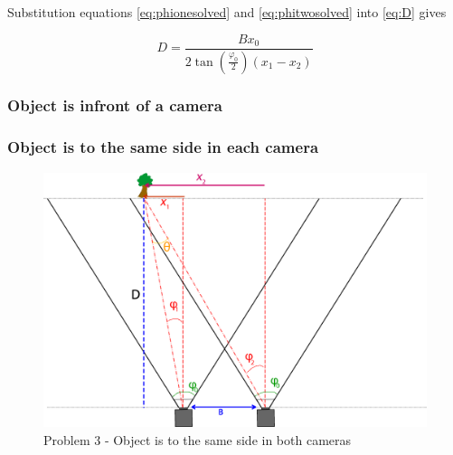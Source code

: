 Substitution equations \eqref{eq:phionesolved} and \eqref{eq:phitwosolved} into \eqref{eq:D} gives

\begin{equation} \label{eq:Distance1}
D = \frac{Bx_0}{2\tan(\frac{\varphi_0}{2})(x_1 - x_2)}
\end{equation}


\subsubsection{Object is infront of a camera}


\subsubsection{Object is to the same side in each camera}

\begin{figure}
\includegraphics[width=\textwidth,height=\textheight,keepaspectratio]{Figures/problem2.png}
\caption{Problem 3 - Object is to the same side in both cameras}
\label{problem_between}
\end{figure}
